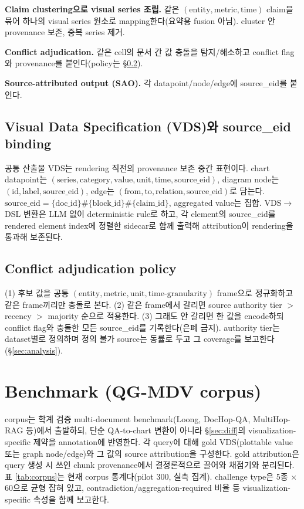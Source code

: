\documentclass[11pt]{article}
\begin{document}
\textbf{Claim clustering으로 visual series 조립.} 같은 $(\text{entity},\text{metric},\text{time})$
claim을 묶어 하나의 visual series 원소로 mapping한다(요약용 fusion 아님). cluster 안 provenance
보존, 중복 series 제거.

\textbf{Conflict adjudication.} 같은 cell의 문서 간 값 충돌을 탐지/해소하고 conflict flag와
provenance를 붙인다(policy는 \S\ref{sec:policy}).

\textbf{Source-attributed output (SAO).} 각 datapoint/node/edge에 source\_eid를 붙인다.

\subsection{Visual Data Specification (VDS)와 source\_eid binding}
\label{sec:vds}
공통 산출물 VDS는 rendering 직전의 provenance 보존 중간 표현이다. chart datapoint는
$(\text{series},\text{category},\text{value},\text{unit},\text{time},\text{source\_eid})$,
diagram node는 $(\text{id},\text{label},\text{source\_eid})$, edge는 $(\text{from},\text{to},
\text{relation},\text{source\_eid})$로 담는다. $\text{source\_eid}=\{\text{doc\_id}\}\#
\{\text{block\_id}\}\#\{\text{claim\_id}\}$, aggregated value는 집합. VDS$\rightarrow$DSL 변환은
LLM 없이 deterministic rule로 하고, 각 element의 source\_eid를 rendered element index에 정렬한
sidecar로 함께 출력해 attribution이 rendering을 통과해 보존된다.

\subsection{Conflict adjudication policy}
\label{sec:policy}
(1) 후보 값을 공통 $(\text{entity},\text{metric},\text{unit},\text{time-granularity})$ frame으로
정규화하고 같은 frame끼리만 충돌로 본다. (2) 같은 frame에서 갈리면 source authority tier $>$
recency $>$ majority 순으로 적용한다. (3) 그래도 안 갈리면 한 값을 encode하되 conflict flag와
충돌한 모든 source\_eid를 기록한다(은폐 금지). authority tier는 dataset별로 정의하며 정의 불가
source는 동률로 두고 그 coverage를 보고한다(\S\ref{sec:analysis}).

\section{Benchmark (QG-MDV corpus)}
\label{sec:bench}
corpus는 학계 검증 multi-document benchmark(Loong, DocHop-QA, MultiHop-RAG 등)에서 출발하되, 단순
QA-to-chart 변환이 아니라 \S\ref{sec:diff}의 visualization-specific 제약을 annotation에 반영한다.
각 query에 대해 gold VDS(plottable value 또는 graph node/edge)와 그 값의 source attribution을
구성한다. gold attribution은 query 생성 시 쓰인 chunk provenance에서 결정론적으로 끌어와 채점기와
분리된다. 표 \ref{tab:corpus}는 현재 corpus 통계다(pilot 300, 실측 집계). challenge type은 5종
$\times$ 60으로 균형 잡혀 있고, contradiction/aggregation-required 비율 등 visualization-specific
속성을 함께 보고한다.
\end{document}
